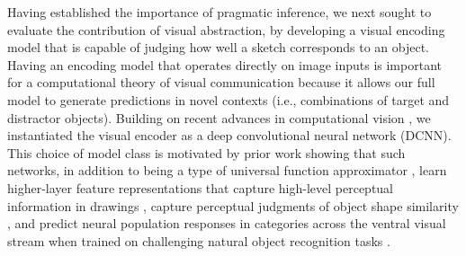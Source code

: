 \documentclass[9pt,twocolumn,twoside]{pnas-new}
\begin{document}
Having established the importance of pragmatic inference, we next sought to evaluate the contribution of visual abstraction, by developing a visual encoding model that is capable of judging how well a sketch corresponds to an object. 
Having an encoding model that operates directly on image inputs is important for a computational theory of visual communication because it allows our full model to generate predictions in novel contexts (i.e., combinations of target and distractor objects).
Building on recent advances in computational vision \cite{FanCommon2018,yamins2014performance}, we instantiated the visual encoder as a deep convolutional neural network (DCNN).
This choice of model class is motivated by prior work showing that such networks, in addition to being a type of universal function approximator \cite{hornik1991approximation}, learn higher-layer feature representations that capture high-level perceptual information in drawings \cite{FanCommon2018}, capture perceptual judgments of object shape similarity \cite{kubilius2016deep}, and predict neural population responses in categories across the ventral visual stream \cite{yamins2014performance} when trained on challenging natural object recognition tasks \cite{deng2009imagenet}. 
\end{document}
